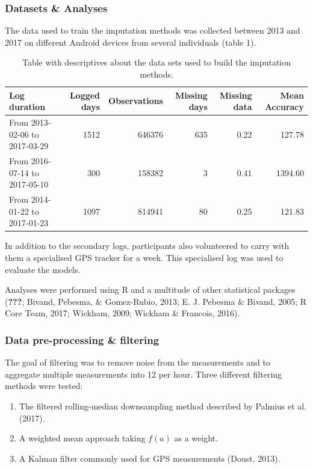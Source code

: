 \documentclass[english,man]{apa6}
\providecommand{\tightlist}{%
  \setlength{\itemsep}{0pt}\setlength{\parskip}{0pt}}
\theoremstyle{definition}
\theoremstyle{definition}
\theoremstyle{definition}
\theoremstyle{remark}
\begin{document}
\subsubsection{Datasets \& Analyses}\label{datasets-analyses}

The data used to train the imputation methods was collected between 2013
and 2017 on different Android devices from several individuals (table
1).

\begin{table}

\caption{\label{tab:datadetailsTable}Table with descriptives about the data sets used to build the imputation methods. }
\centering
\begin{tabular}[t]{l|r|r|r|r|r}
\hline
Log duration & Logged days & Observations & Missing days & Missing data & Mean Accuracy\\
\hline
From 2013-02-06 to 2017-03-29 & 1512 & 646376 & 635 & 0.22 & 127.78\\
\hline
From 2016-07-14 to 2017-05-10 & 300 & 158382 & 3 & 0.41 & 1394.60\\
\hline
From 2014-01-22 to 2017-01-23 & 1097 & 814941 & 80 & 0.25 & 121.83\\
\hline
\end{tabular}
\end{table}

In addition to the secondary logs, participants also volunteered to
carry with them a specialised GPS tracker for a week. This specialised
log was used to evaluate the models.

Analyses were performed using R and a multitude of other statistical
packages ({\textbf{???}}; Bivand, Pebesma, \& Gomez-Rubio, 2013; E. J.
Pebesma \& Bivand, 2005; R Core Team, 2017; Wickham, 2009; Wickham \&
Francois, 2016).

\subsubsection{Data pre-processing \&
filtering}\label{data-pre-processing-filtering}

The goal of filtering was to remove noise from the measurements and to
aggregate multiple measurements into 12 per hour. Three different
filtering methods were tested:

\begin{enumerate}
\def\labelenumi{\arabic{enumi}.}
\tightlist
\item
  The filtered rolling-median downsampling method described by Palmius
  et al. (2017).
\item
  A weighted mean approach taking \(f(a)\) as a weight.
\item
  A Kalman filter commonly used for GPS measurements (Doust, 2013).
\end{enumerate}
\end{document}
